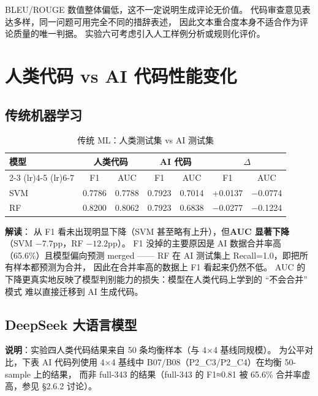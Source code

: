 \documentclass{experimentreport}
\begin{document}
BLEU/ROUGE 数值整体偏低，这不一定说明生成评论无价值。
代码审查意见表达多样，同一问题可用完全不同的措辞表述，
因此文本重合度本身不适合作为评论质量的唯一判据。
实验六可考虑引入人工样例分析或规则化评价。

\section{人类代码 vs AI 代码性能变化}

\subsection{传统机器学习}

\begin{table}[htbp]
\centering
\caption{传统 ML：人类测试集 vs AI 测试集}
\begin{tabular}{lcccccc}
\toprule
\multirow{2}{*}{模型} & \multicolumn{2}{c}{人类代码} & \multicolumn{2}{c}{AI 代码} & \multicolumn{2}{c}{$\Delta$} \\
\cmidrule(lr){2-3} \cmidrule(lr){4-5} \cmidrule(lr){6-7}
 & F1 & AUC & F1 & AUC & F1 & AUC \\
\midrule
SVM & 0.7786 & 0.7788 & 0.7923 & 0.7014 & +0.0137 & $-$0.0774 \\
RF  & 0.8200 & 0.8062 & 0.7923 & 0.6838 & $-$0.0277 & $-$0.1224 \\
\bottomrule
\end{tabular}
\end{table}

\textbf{解读}：
从 F1 看未出现明显下降（SVM 甚至略有上升），但\textbf{AUC 显著下降}（SVM $-7.7$pp，RF $-12.2$pp）。
F1 没掉的主要原因是 AI 数据合并率高（65.6\%）且模型偏向预测 merged ——
RF 在 AI 测试集上 Recall=1.0，即把所有样本都预测为合并，
因此在合并率高的数据上 F1 看起来仍然不低。
AUC 的下降更真实地反映了模型判别能力的损失：模型在人类代码上学到的 ``不会合并'' 模式
难以直接迁移到 AI 生成代码。

\subsection{DeepSeek 大语言模型}

\textbf{说明}：实验四人类代码结果来自 50 条均衡样本（与 4×4 基线同规模）。
为公平对比，下表 AI 代码列使用 4×4 基线中 B07/B08（P2\_C3/P2\_C4）在均衡 50-sample 上的结果，
而非 full-343 的结果（full-343 的 F1≈0.81 被 65.6\% 合并率虚高，参见 §2.6.2 讨论）。
\end{document}
